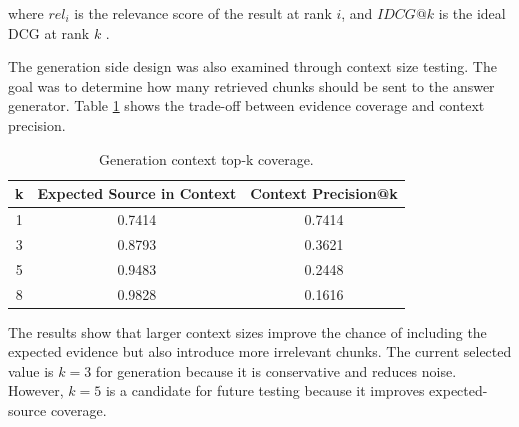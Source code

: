 \documentclass[12pt,oneside,openany]{report}
\begin{document}
where $rel_i$ is the relevance score of the result at rank $i$, and $IDCG@k$ is the ideal DCG at rank $k$ \cite{jarvelin2002ndcg}.

The generation side design was also examined through context size testing. The goal was to determine how many retrieved chunks should be sent to the answer generator. Table \ref{tab:topk_context_updated} shows the trade-off between evidence coverage and context precision.

\begin{table}[h]
\centering
\caption{Generation context top-k coverage.}
\label{tab:topk_context_updated}
\begin{tabular}{|c|c|c|}
\hline
\textbf{k} & \textbf{Expected Source in Context} & \textbf{Context Precision@k} \\
\hline
1 & 0.7414 & 0.7414 \\
\hline
3 & 0.8793 & 0.3621 \\
\hline
5 & 0.9483 & 0.2448 \\
\hline
8 & 0.9828 & 0.1616 \\
\hline
\end{tabular}
\end{table}

The results show that larger context sizes improve the chance of including the expected evidence but also introduce more irrelevant chunks. The current selected value is $k=3$ for generation because it is conservative and reduces noise. However, $k=5$ is a candidate for future testing because it improves expected-source coverage.

\printbibliography
\end{document}
